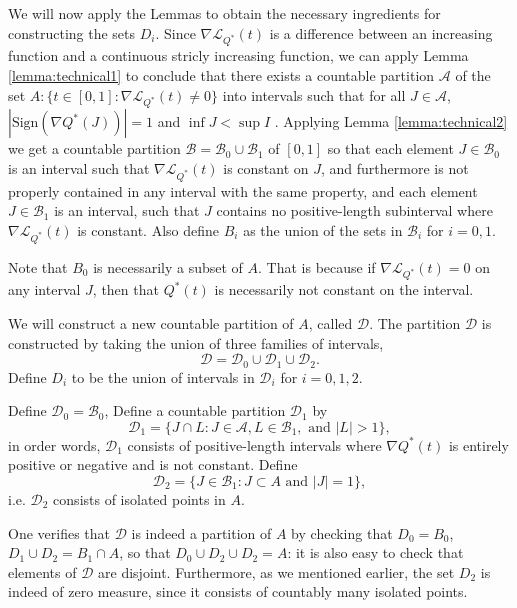 We will now apply the Lemmas to obtain the necessary ingredients for
constructing the sets $D_i$.  Since $\nabla \mathcal{L}_{Q^*}(t)$ is a difference
between an increasing function and a continuous stricly increasing
function, we can apply Lemma \ref{lemma:technical1} to conclude that
there exists a countable partition $\mathcal{A}$ of the set
$A: \{t \in [0,1]: \nabla \mathcal{L}_{Q^*}(t) \neq 0\}$ into intervals such that
for all $J \in \mathcal{A}$, $|\text{Sign}(\nabla Q^*(J))| = 1$ and
$\inf J < \sup I$ .  Applying Lemma \ref{lemma:technical2} we get a
countable partition $\mathcal{B} = \mathcal{B}_0 \cup \mathcal{B}_1$
of $[0,1]$ so that each element $J \in \mathcal{B}_0$ is an interval
such that $\nabla \mathcal{L}_{Q^*}(t)$ is constant on $J$, and furthermore is not
properly contained in any interval with the same property, and each
element $J \in \mathcal{B}_1$ is an interval, such that $J$ contains
no positive-length subinterval where $\nabla \mathcal{L}_{Q^*}(t)$ is constant.
Also define $B_i$ as the union of the sets in $\mathcal{B}_i$ for $i =
0,1$.

Note that $B_0$ is necessarily a subset of $A$.  That is because if
$\nabla \mathcal{L}_{Q^*}(t) = 0$ on any interval $J$, then that $Q^*(t)$ is
necessarily not constant on the interval.  

We will construct a new countable partition of $A$, called $\mathcal{D}$.
The partition $\mathcal{D}$ is constructed by taking the union of three families of intervals,
\[
\mathcal{D} = \mathcal{D}_0 \cup \mathcal{D}_1 \cup \mathcal{D}_2.
\]
Define $D_i$ to be the union of intervals in $\mathcal{D}_i$ for $i = 0,1,2$.

Define $\mathcal{D}_0 = \mathcal{B}_0$,
Define a countable partition $\mathcal{D}_1$ by
\[
\mathcal{D}_1 = \{J \cap L: J \in \mathcal{A}, L \in \mathcal{B}_1, \text{ and } |L| > 1\},
\]
in order words, $\mathcal{D}_1$ consists of positive-length intervals where $\nabla
Q^*(t)$ is entirely positive or negative and is not constant.
Define
\[
\mathcal{D}_2 = \{J \in \mathcal{B}_1: J \subset A \text{ and } |J| = 1 \},
\]
i.e. $\mathcal{D}_2$ consists of isolated points in $A$.

One verifies that $\mathcal{D}$ is indeed a partition of $A$ by
checking that $D_0 = B_0$, $D_1 \cup D_2 = B_1 \cap A$, so that
$D_0 \cup D_2 \cup D_2 = A$: it is also easy to check that elements of
$\mathcal{D}$ are disjoint.  Furthermore, as we mentioned earlier, the
set $D_2$ is indeed of zero measure, since it consists of countably
many isolated points.


